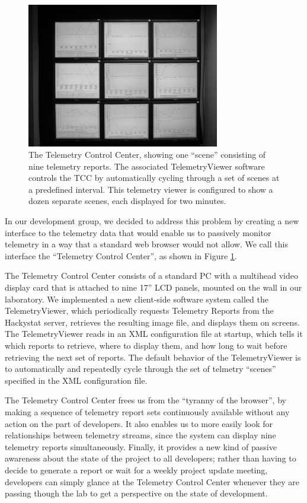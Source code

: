 \documentclass[11pt,twocolumn]{article}
\begin{document}
\begin{figure}[ht]
  \centering
  \includegraphics[width=0.75\textwidth]{Wall.eps}

  \caption{The Telemetry Control Center, showing one ``scene'' consisting
  of nine telemetry reports. The associated TelemetryViewer software 
  controls the TCC by automatically cycling
  through a set of scenes at a predefined interval. This 
  telemetry viewer is configured to show a dozen separate
  scenes, each displayed for two minutes.  }
  \label{fig:telemetrycontrolcenter}
\end{figure}

In our development group, we decided to address this problem by creating a
new interface to the telemetry data that would enable us to passively
monitor telemetry in a way that a standard web browser would not allow. We
call this interface the ``Telemetry Control Center'', as shown in Figure
\ref{fig:telemetrycontrolcenter}.  

The Telemetry Control Center consists of a standard PC with a multihead
video display card that is attached to nine 17'' LCD panels, mounted on the
wall in our laboratory.  We implemented a new client-side software system
called the TelemetryViewer, which periodically requests Telemetry Reports
from the Hackystat server, retrieves the resulting image file, and displays
them on screens.  The TelemetryViewer reads in an XML configuration file at
startup, which tells it which reports to retrieve, where to display them,
and how long to wait before retrieving the next set of reports. The default
behavior of the TelemetryViewer is to automatically and repeatedly cycle
through the set of telmetry ``scenes'' specified in the XML configuration
file.

The Telemetry Control Center frees us from the ``tyranny of the browser'',
by making a sequence of telemetry report sets continuously available
without any action on the part of developers. It also enables us to more
easily look for relationships between telemetry streams, since the system
can display nine telemetry reports simultaneously.  Finally, it provides a
new kind of passive awareness about the state of the project to all
developers; rather than having to decide to generate a report or wait for a
weekly project update meeting, developers can simply glance at the
Telemetry Control Center whenever they are passing though the lab to get a
perspective on the state of development. 
\end{document}
